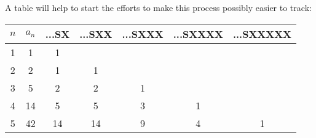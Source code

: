 \documentclass{article}
\begin{document}
\par

A table will help to start the efforts to make this process possibly easier to track:

\begin{table}[h!]
\centering
 \begin{tabular}{|c | c | c | c | c | c | c|} 
 \hline
 $n$ & $a_n$ & ...SX & ...SXX & ...SXXX & ...SXXXX & ...SXXXXX \\ [0.5ex] 
 \hline
 1 & 1 & 1 &  &  &  & \\ 
 2 & 2 & 1 & 1 &  &  & \\
 3 & 5 & 2 & 2 & 1 &  & \\
 4 & 14 & 5 & 5 & 3 & 1 & \\
 5 & 42 & 14 & 14 & 9 & 4 & 1 \\
 \hline
 \end{tabular}
\end{table}
\end{document}
